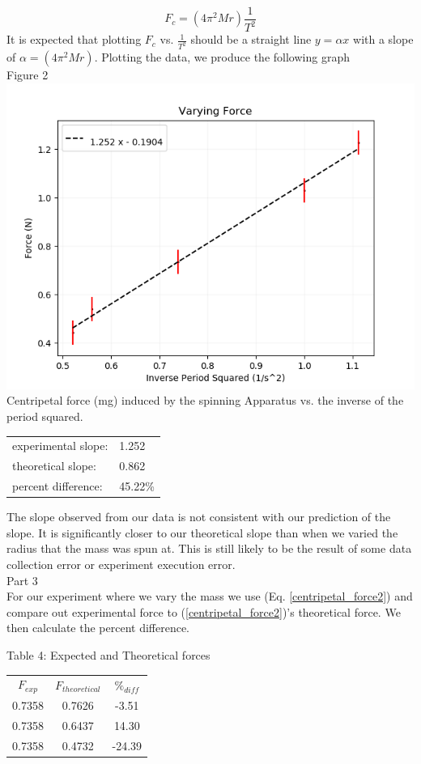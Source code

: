 \documentclass[12pt]{report}
\begin{document}
\begin{flushleft}
\begin{multicols}{2}
\begin{equation}
F_c = (4\pi^2Mr)\frac{1}{T^2}
\end{equation}
It is expected that plotting $F_c$ vs. $\frac{1}{T^2}$ should be a straight line $y = \alpha x$ with a slope of
$\alpha = (4\pi^2Mr)$. Plotting the data, we produce the following graph \\
\small Figure 2 \\
\includegraphics[scale=0.45]{VaryingForce}
\center Centripetal force (mg) induced by the spinning Apparatus vs. the inverse
of the period squared.\\
\begin{tabular}{ll}
experimental slope: & 1.252 \\
theoretical slope: & 0.862 \\
percent difference: & 45.22\%
\end{tabular}
\flushleft The slope observed from our data is not consistent with our
prediction of the slope. It is significantly closer to our theoretical slope than
when we varied the radius that the mass was spun at. This is still likely to be the result of some data collection error or experiment execution error. \\
\vspace{10px}
\large Part 3 \\ \normalsize
For our experiment where we vary the mass we use (Eq. \ref{centripetal_force2})
and compare out experimental force to (\ref{centripetal_force2})'s theoretical force.
We then calculate the percent difference. \\
\begin{center}
\flushleft Table 4: Expected and Theoretical forces \center
\begin{tabular}{|c|c|c|}
\hline
$F_{exp}$ & $F_{theoretical}$ & $\%_{diff}$ \\
0.7358 & 0.7626 & -3.51 \\
0.7358 & 0.6437 & 14.30 \\
0.7358 & 0.4732 & -24.39 \\
\hline
\end{tabular}
\end{center}


\end{multicols}
\end{flushleft}
\end{document}
